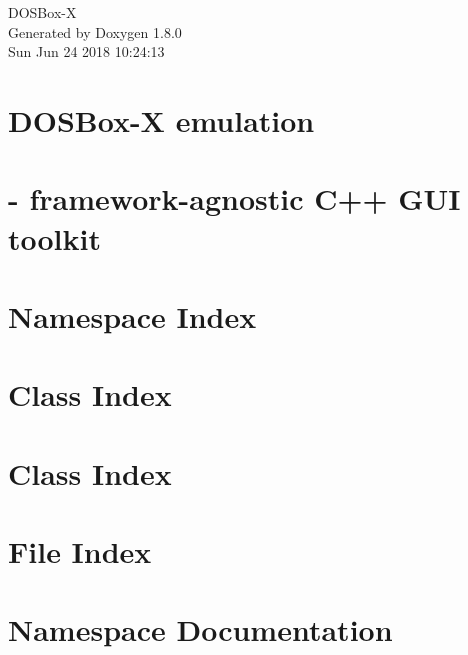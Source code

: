 \documentclass{book}
\begin{document}
\hypersetup{pageanchor=false,citecolor=blue}
\begin{titlepage}
\vspace*{7cm}
\begin{center}
{\Large D\-O\-S\-Box-\/\-X }\\
\vspace*{1cm}
{\large Generated by Doxygen 1.8.0}\\
\vspace*{0.5cm}
{\small Sun Jun 24 2018 10:24:13}\\
\end{center}
\end{titlepage}
\clearemptydoublepage
{}
\tableofcontents
\clearemptydoublepage
{}
\hypersetup{pageanchor=true,citecolor=blue}
\chapter{D\-O\-S\-Box-\/\-X emulation}
\label{index}\hypertarget{index}{}
\chapter{-\/ framework-\/agnostic C++ G\-U\-I toolkit}
\label{gui::tk}
\hypertarget{gui::tk}{}

\chapter{Namespace Index}

\chapter{Class Index}

\chapter{Class Index}

\chapter{File Index}

\chapter{Namespace Documentation}


\end{document}
